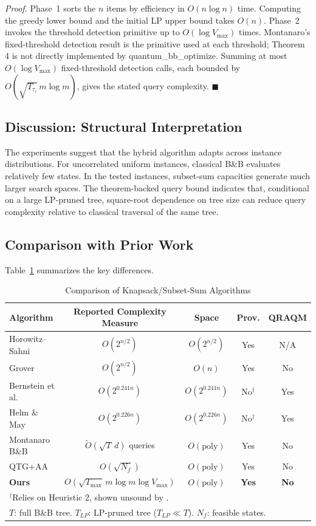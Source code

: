 \documentclass[conference]{IEEEtran} \IEEEoverridecommandlockouts
\begin{document}
\textit{Proof.} Phase~1 sorts the $n$ items by efficiency in $O(n \log n)$ time. Computing the greedy lower bound and the initial LP upper bound takes $O(n)$. Phase~2 invokes the threshold detection primitive up to $O(\log V_{\max})$ times. Montanaro's fixed-threshold detection result is the primitive used at each threshold; Theorem 4 is not directly implemented by quantum\_bb\_optimize. Summing at most $O(\log V_{\max})$ fixed-threshold detection calls, each bounded by $O(\sqrt{T_{\tau_i}}\,m\log m)$, gives the stated query complexity. \hfill$\blacksquare$

\subsection{Discussion: Structural Interpretation}
The experiments suggest that the hybrid algorithm adapts across instance distributions. For uncorrelated uniform instances, classical B\&B evaluates relatively few states. In the tested instances, subset-sum capacities generate much larger search spaces. The theorem-backed query bound indicates that, conditional on a large LP-pruned tree, square-root dependence on tree size can reduce query complexity relative to classical traversal of the same tree.

\subsection{Comparison with Prior Work}

Table~\ref{tab:comparison} summarizes the key differences.

\begin{table}[t]
\caption{Comparison of Knapsack/Subset-Sum Algorithms}
\label{tab:comparison}
\begin{center}
\footnotesize
\begin{tabular}{lcccc}
\toprule
\textbf{Algorithm} & \textbf{Reported Complexity Measure} & \textbf{Space} & \textbf{Prov.} & \textbf{QRAQM} \\
\midrule
Horowitz--Sahni & $O(2^{n/2})$ & $O(2^{n/2})$ & Yes & N/A \\
Grover & $O(2^{n/2})$ & $O(n)$ & Yes & No \\
Bernstein et al. & $O(2^{0.241n})$ & $O(2^{0.241n})$ & No$^\dagger$ & Yes \\
Helm \& May & $O(2^{0.226n})$ & $O(2^{0.226n})$ & No$^\dagger$ & Yes \\
Montanaro B\&B & $\tilde{O}(\sqrt{T}\,d)$ queries & $O(\text{poly})$ & Yes & No \\
QTG+AA & $O(\sqrt{N_f})$ & $O(\text{poly})$ & Yes & No \\
\textbf{Ours} & $O(\sqrt{T_{\max}}\,m\log m\log V_{\max})$ & $O(\text{poly})$ & \textbf{Yes} & \textbf{No} \\
\bottomrule
\multicolumn{5}{p{0.7\textwidth}}{\footnotesize $^\dagger$Relies on Heuristic 2, shown unsound by \cite{bonnetain2020improved}.} \\
\multicolumn{5}{p{0.7\textwidth}}{\footnotesize $T$: full B\&B tree. $T_{LP}$: LP-pruned tree ($T_{LP} \ll T$). $N_f$: feasible states.}
\end{tabular}
\end{center}
\end{table}
\end{document}
